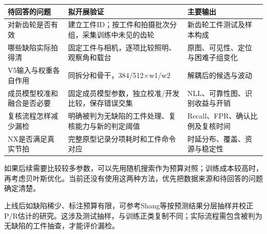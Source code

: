 \par\medskip\noindent\begin{minipage}{\linewidth}\small{}
\begin{tabular}{@{}>{\raggedright\arraybackslash}p{0.240\dimexpr\linewidth-4\tabcolsep\relax}>{\raggedright\arraybackslash}p{0.340\dimexpr\linewidth-4\tabcolsep\relax}>{\raggedright\arraybackslash}p{0.420\dimexpr\linewidth-4\tabcolsep\relax}@{}}
\toprule
待回答的问题 & 拟开展验证 & 主要输出 \\
\midrule
对新齿轮是否有效 & 建立工件ID；按工件和拍摄批次分组，采集训练中未见的齿轮 & 新齿轮工件测试及样本构成 \\
哪些缺陷实际拍得清 & 固定工件与相机，逐项比较照明、观察角和载台 & 原图、可见性、定位与困难子组变化 \\
V5输入与权重各自作用 & 同拆分和骨干，384/512\ensuremath{\times}w1/w2 & 解耦后的候选与波动 \\
成员模型校准和融合是否必要 & 固定成员模型参数，独立校准/开发比较，保存错误交集 & NLL、可靠性图、识别收益与开销 \\
复核流程怎样减少漏检 & 明确被判为无缺陷的工件处理、复核能力与新的判定阈值 & Recall、FPR、确认比例及复核时间 \\
NX是否满足真实节拍 & 完整原型记录分项耗时和工件命令对应 & 时延分布、覆盖、资源与稳定性 \\
\bottomrule\end{tabular}\end{minipage}\par\medskip

如果后续需要比较较多参数，可以先用随机搜索作为预算对照\cite{ref7}；训练成本较高时，再考虑贝叶斯优化\cite{ref8}。当前还没有使用这两种方法，优先把数据来源和待回答的问题确定清楚。

上线后如缺陷稀少、标注预算有限，可参考Shang等按预测结果分层抽样并校正P/R估计的研究\cite{ref9}。这涉及测试抽样，与训练正类复制不同；实际流程需包含被判为无缺陷的工件抽查，才能评价漏检。

